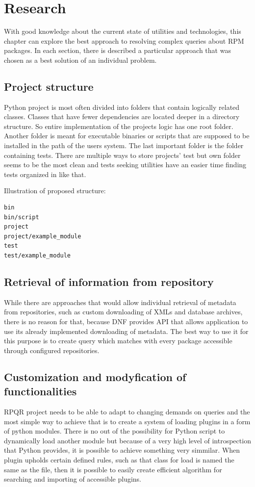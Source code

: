 \chapter{Research}
With good knowledge about the current state of utilities and technologies, this chapter can explore
the best approach to resolving complex queries about RPM packages. In each section,
there is described a particular approach that was chosen as a best solution of an individual problem.

\section{Project structure}
Python project is most often divided into folders that contain logically related classes.
Classes that have fewer dependencies are located deeper in a directory structure. So entire
implementation of the projects logic has one root folder. Another folder is meant for executable
binaries or scripts that are supposed to be installed in the path of the users system. The last important
folder is the folder containing tests. There are multiple ways to store projects' test but own folder
seems to be the most clean and tests seeking utilities have an easier time finding tests organized in
like that.

Illustration of proposed structure:

\begin{lstlisting}
bin
bin/script
project
project/example_module
test
test/example_module
\end{lstlisting}

\newpage

\section{Retrieval of information from repository}
While there are approaches that would allow individual retrieval of metadata from repositories,
such as custom downloading of XMLs and database archives, there is no reason for that, because
DNF provides API that allows application to use its already implemented downloading of metadata.
The best way to use it for this purpose is to create query which matches with every package
accessible through configured repositories.

\section{Customization and modyfication of functionalities}
RPQR project needs to be able to adapt to changing demands on queries and the most simple way to
achieve that is to create a system of loading plugins in a form of python modules. There is no
out of the possibility for Python script to dynamically load another module but because of a very
high level of introspection that Python provides, it is possible to achieve something very simmilar.
When plugin upholds certain defined rules, such as that class for load is named the same as the file,
then it is possible to easily create efficient algorithm for searching and importing of accessible
plugins.

